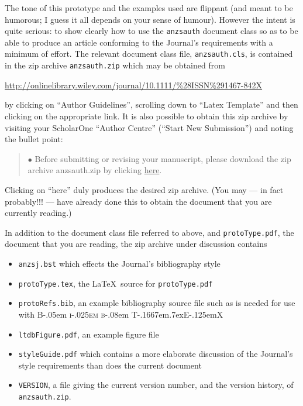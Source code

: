 \documentclass[
  times,
  doublespace]{anzsauth}
\providecommand{\tightlist}{%
  \setlength{\itemsep}{0pt}\setlength{\parskip}{0pt}}\usepackage{longtable,booktabs,array}
\newcommand\BibTeX{{\rmfamily B\kern-.05em \textsc{i\kern-.025em b}\kern-.08em
T\kern-.1667em\lower.7ex\hbox{E}\kern-.125emX}}
\begin{document}
The tone of this prototype and the examples used are flippant (and meant
to be humorous; I guess it all depends on your sense of humour). However
the intent is quite serious: to show clearly how to use the
\texttt{anzsauth} document class so as to be able to produce an article
conforming to the Journal's requirements with a minimum of effort. The
relevant document class file, \texttt{anzsauth.cls}, is contained in the
zip archive \texttt{anzsauth.zip} which may be obtained from

\url{http://onlinelibrary.wiley.com/journal/10.1111/\%28ISSN\%291467-842X}

by clicking on ``Author Guidelines'', scrolling down to ``Latex
Template'' and then clicking on the appropriate link. It is also
possible to obtain this zip archive by visiting your ScholarOne ``Author
Centre'' (``Start New Submission'') and noting the bullet point:

\begin{quote}
\(\bullet\) Before submitting or revising your manuscript, please
download the zip archive anzsauth.zip by clicking \underline{here}.
\end{quote}

Clicking on ``here'' duly produces the desired zip archive. (You may ---
in fact probably!!! --- have already done this to obtain the document
that you are currently reading.)

In addition to the document class file referred to above, and
\texttt{protoType.pdf}, the document that you are reading, the zip
archive under discussion contains

\begin{itemize}
\tightlist
\item
  \texttt{anzsj.bst} which effects the Journal's bibliography style
\item
  \texttt{protoType.tex}, the \LaTeX~source for \texttt{protoType.pdf}
\item
  \texttt{protoRefs.bib}, an example bibliography source file such as is
  needed for use with \BibTeX
\item
  \texttt{ltdbFigure.pdf}, an example figure file
\item
  \texttt{styleGuide.pdf} which contains a more elaborate discussion of
  the Journal's style requirements than does the current document
\item
  \texttt{VERSION}, a file giving the current version number, and the
  version history, of \texttt{anzsauth.zip}.
\end{itemize}
\end{document}
